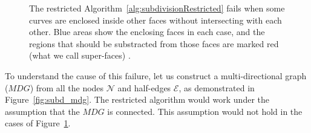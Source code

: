 \begin{figure}
\begin{subfigure}{.32\textwidth}
  \end{subfigure}%
  \caption[xxx]
          {The restricted Algorithm~\ref{alg:subdivisionRestricted} fails when some curves are enclosed inside other faces without intersecting with each other.
          Blue areas show the enclosing faces in each case, and the regions that should be substracted from those faces are marked red (what we call super-faces) .}
  \label{fig:subd_restrictedFail}
\end{figure}

To understand the cause of this failure, let us construct a multi-directional graph ($\mathit{MDG}$) from all the nodes $\mathcal{N}$ and half-edges $\mathcal{E}$, as demonstrated in Figure~\ref{fig:subd_mdg}.
The restricted algorithm would work under the assumption that the $\mathit{MDG}$ is connected.
This assumption would not hold in the cases of Figure~\ref{fig:subd_restrictedFail}.

